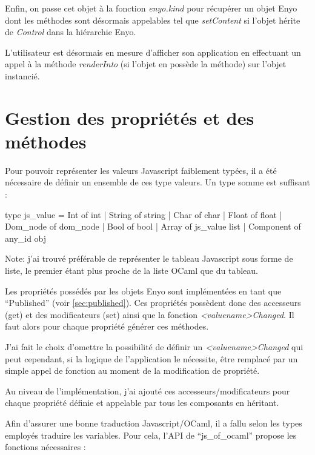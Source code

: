 
Enfin, on passe cet objet à la fonction \emph{enyo.kind} pour récupérer un objet Enyo
dont les méthodes sont désormais appelables tel que \emph{setContent} si l'objet hérite 
de \emph{Control} dans la hiérarchie Enyo.

L'utilisateur est désormais en mesure d'afficher son application en effectuant un appel
à la méthode \emph{renderInto} (si l'objet en possède la méthode) sur l'objet instancié.

\section{Gestion des propriétés et des méthodes}\label{gestprop}

Pour pouvoir représenter les valeurs Javascript faiblement typées, il a été nécessaire de définir un 
ensemble de ces type valeurs. Un type somme est suffisant :

\begin{OCaml}
    type js_value = Int of int | String of string 
                  | Char of char | Float of float 
                  | Dom_node of dom_node | Bool of bool 
                  | Array of js_value list | Component of any_id obj 
\end{OCaml}

Note: j'ai trouvé préférable de représenter le tableau Javascript sous forme de liste,
le premier étant plus proche de la liste OCaml que du tableau.\medskip

Les propriétés possédés par les objets Enyo sont implémentées en tant que ``Published'' 
(voir \ref{sec:published}). Ces propriétés possèdent donc des accesseurs (get) et des modificateurs (set) ainsi
que la fonction \emph{<valuename>Changed}. Il faut alors pour chaque propriété générer ces méthodes.

J'ai fait le choix d'omettre la possibilité de définir un \emph{<valuename>Changed} qui peut cependant,
si la logique de l'application le nécessite, être remplacé par un simple appel de fonction au moment
de la modification de propriété.

Au niveau de l'implémentation, j'ai ajouté ces accesseurs/modificateurs pour chaque propriété définie 
et appelable par tous les composants en héritant.

Afin d'assurer une bonne traduction Javascript/OCaml, il a fallu selon les types employés traduire
les variables. Pour cela, l'API de ``js\_of\_ocaml'' propose les fonctions nécessaires :

